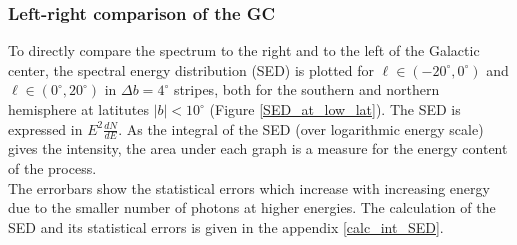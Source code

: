 \documentclass[a4paper]{article}
\begin{document}
\subsubsection{Left-right comparison of the GC}
To directly compare the spectrum to the right and to the left of the Galactic center, the spectral energy distribution (SED) is plotted for $\ell \in (-20^\circ, 0^\circ)$ and $\ell \in (0^\circ, 20^\circ)$ in $\Delta b = 4^\circ$ stripes, both for the southern and northern hemisphere at latitutes $|b| < 10^\circ$ (Figure \ref{SED_at_low_lat}). The SED is expressed in $E^2 \frac{dN}{dE}$. As the integral of the SED (over logarithmic energy scale) gives the intensity, the area under each graph is a measure for the energy content of the process.\\
The errorbars show the statistical errors which increase with increasing energy due to the smaller number of photons at higher energies. The calculation of the SED and its statistical errors is given in the appendix \ref{calc_int_SED}.
\end{document}
